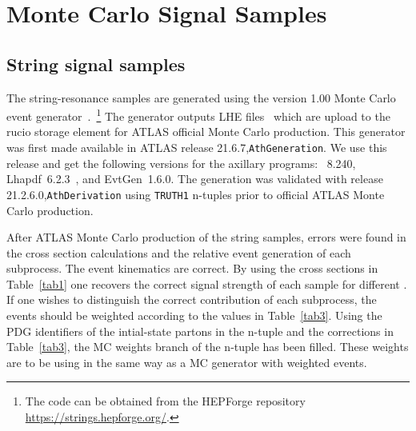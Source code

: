 \section{Monte Carlo Signal Samples}
\label{section:MCSignalSamples}

\subsection{String signal samples}
\label{section:MCStringSamples}

The string-resonance samples are generated using the \str version 1.00
Monte Carlo event
generator~\cite{Vakilipourtakalou:2018pfo}.~\footnote{The code can be
obtained from the HEPForge
repository \url{https://strings.hepforge.org/}.} 
The generator outputs LHE files~\cite{Alwall:2006yp} which are upload
to the rucio storage element for ATLAS official Monte Carlo production.
This generator was first made available in ATLAS
release 21.6.7,\texttt{AthGeneration}.   
We use this release and get the following versions for the axillary
programs: \pythia~8.240, Lhapdf~6.2.3~\cite{Buckley:2014ana}, and
EvtGen~1.6.0. 
The generation was validated with
release 21.2.6.0,\texttt{AthDerivation} using \texttt{TRUTH1} n-tuples
prior to official ATLAS Monte Carlo production.

After ATLAS Monte Carlo production of the string samples, errors were
found in the cross section calculations and the relative event
generation of each subprocess.
The event kinematics are correct.
By using the cross sections in Table~\ref{tab1} one recovers the
correct signal strength of each sample for different \Ms.
If one wishes to distinguish the correct contribution of each
subprocess, the events should be weighted according to the values in
Table~\ref{tab3}. 
Using the PDG identifiers of the intial-state partons in the n-tuple
and the corrections in Table~\ref{tab3}, the MC weights branch of the
n-tuple has been filled. 
These weights are to be using in the same way as a MC generator with
weighted events.  

